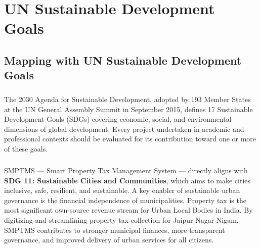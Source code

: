 \chapter{UN Sustainable Development Goals}
\section{Mapping with UN Sustainable Development Goals}
\paragraph{}The 2030 Agenda for Sustainable Development, adopted by 193 Member States at the UN General Assembly Summit in September 2015, defines 17 Sustainable Development Goals (SDGs) covering economic, social, and environmental dimensions of global development. Every project undertaken in academic and professional contexts should be evaluated for its contribution toward one or more of these goals.

\paragraph{}SMPTMS --- Smart Property Tax Management System --- directly aligns with \textbf{SDG 11: Sustainable Cities and Communities}, which aims to make cities inclusive, safe, resilient, and sustainable. A key enabler of sustainable urban governance is the financial independence of municipalities. Property tax is the most significant own-source revenue stream for Urban Local Bodies in India. By digitizing and streamlining property tax collection for Jaipur Nagar Nigam, SMPTMS contributes to stronger municipal finances, more transparent governance, and improved delivery of urban services for all citizens.


